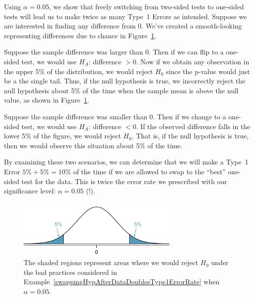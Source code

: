 \begin{example}{Using $\alpha=0.05$, we show that freely switching from two-sided tests to one-sided tests will lead us to make twice as many Type~1 Errors as intended.} \label{swappingHypAfterDataDoublesType1ErrorRate}
Suppose we are interested in finding any difference from 0. We've created a smooth-looking  representing differences due to chance in Figure~\ref{type1ErrorDoublingExampleFigure}.

Suppose the sample difference was larger than 0. Then if we can flip to a one-sided test, we would use $H_A$: difference $> 0$. Now if we obtain any observation in the upper 5\% of the distribution, we would reject $H_0$ since the p-value would just be a the single tail. Thus, if the null hypothesis is true, we incorrectly reject the null hypothesis about 5\% of the time when the sample mean is above the null value, as shown in Figure~\ref{type1ErrorDoublingExampleFigure}.

Suppose the sample difference was smaller than 0. Then if we change to a one-sided test, we would use $H_A$: difference $< 0$. If the observed difference falls in the lower 5\% of the figure, we would reject $H_0$. That is, if the null hypothesis is true, then we would observe this situation about 5\% of the time.

By examining these two scenarios, we can determine that we will make a Type~1 Error $5\%+5\%=10\%$ of the time if we are allowed to swap to the ``best'' one-sided test for the data. This is twice the error rate we prescribed with our significance level: $\alpha=0.05$ (!).

\begin{figure}
\centering
\includegraphics[width=0.7\textwidth]{02/figures/type1ErrorDoublingExampleFigure/type1ErrorDoublingExampleFigure}
\caption{The shaded regions represent areas where we would reject $H_0$ under the bad practices considered in Example~\ref{swappingHypAfterDataDoublesType1ErrorRate} when $\alpha = 0.05$.}
\label{type1ErrorDoublingExampleFigure}
\end{figure}

\end{example}

